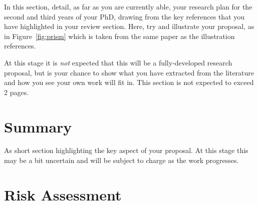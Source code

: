 \documentclass[a4paper,12pt]{article}
\begin{document}
In this section, detail, as far as you are currently able, 
your research plan for the second and third years of your PhD, 
drawing from the key references \cite{jr:block} that you have highlighted in your review section. 
Here, try and illustrate
your proposal, as in Figure~\ref{fig:prism} which is taken from the
same paper as the illustration references.
%
%

At this stage it is {\em not} expected that this will be a fully-developed
research proposal, but is your chance to show what you have extracted from the
literature and how you see your own work will fit in. This section is
not expected to exceed 2 pages.
 
\section{Summary}

As short section highlighting the key aspect of your proposal.
At this stage this may be a bit uncertain and will be subject
to charge as the work progresses.

\section{Risk Assessment}



\end{document}
